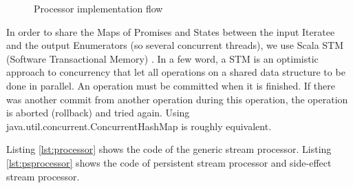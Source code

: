 \begin{figure}
  \begin{center} 
    \caption{Processor implementation flow}
    \label{fig:createOutStream}
  \end{center}
\end{figure}

In order to share the Maps of Promises and States between the input Iteratee and the output Enumerators (so several concurrent threads), we use Scala STM (Software Transactional Memory) . In a few word, a STM is an optimistic approach to concurrency that let all operations on a shared data structure to be done in parallel. An operation must be committed when it is finished. If there was another commit from another operation during this operation, the operation is aborted (rollback) and tried again. 
Using java.util.concurrent.ConcurrentHashMap is roughly equivalent.

Listing \ref{lst:processor} shows the code of the generic stream processor. Listing \ref{lst:psprocessor} shows the code of persistent stream processor and side-effect stream processor. 
\newpage


